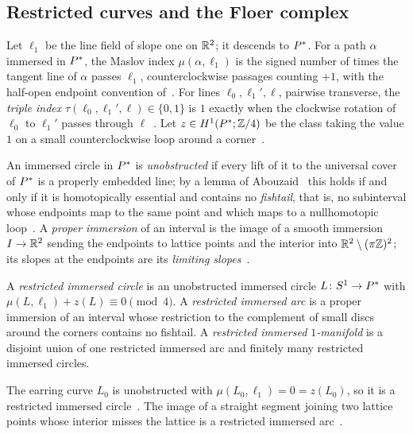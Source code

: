 \subsection{Restricted curves and the Floer complex}\label{ss:restricted}
Let $\ell_1$ be the line field of slope one on $\mathbb{R}^2$; it descends to $P^{*}$. For a path $\alpha$ immersed in $P^{*}$,
the Maslov index $\mu(\alpha,\ell_1)$ is the signed number of times the tangent line of $\alpha$ passes $\ell_1$,
counterclockwise passages counting $+1$, with the half-open endpoint convention of~\cite[\S2.3]{HHK2}. For lines
$\ell_0,\ell_1',\ell$, pairwise transverse, the \emph{triple index} $\tau(\ell_0,\ell_1',\ell)\in\{0,1\}$ is $1$
exactly when the clockwise rotation of $\ell_0$ to $\ell_1'$ passes through $\ell$~\cite[Def.~2.5]{HHK2}. Let $z\in
H^1(P^{*};\mathbb{Z}/4)$ be the class taking the value $1$ on a small counterclockwise loop around a
corner~\cite[Def.~3.1]{HHK2}.

An immersed circle in $P^{*}$ is \emph{unobstructed} if every lift of it to the universal cover of $P^{*}$ is a
properly embedded line; by a lemma of Abouzaid~\cite[Lemma~2.2]{Abouzaid} this holds if and only if it is
homotopically essential and contains no \emph{fishtail}, that is, no subinterval whose endpoints map to the same
point and which maps to a nullhomotopic loop~\cite[Def.~2.1]{HHK2}. A \emph{proper immersion} of an interval is
the image of a smooth immersion $I\to\mathbb{R}^2$ sending the endpoints to lattice points and the interior into
$\mathbb{R}^2\setminus(\pi\mathbb{Z})^2$; its slopes at the endpoints are its \emph{limiting slopes}~\cite[Def.~3.3]{HHK2}.

\begin{definition}\label{def:restricted}
A \emph{restricted immersed circle} is an unobstructed immersed circle $L\colon S^1\to P^{*}$ with
$\mu(L,\ell_1)+z(L)\equiv0\pmod4$. A \emph{restricted immersed arc} is a proper immersion of an interval whose
restriction to the complement of small discs around the corners contains no fishtail. A \emph{restricted immersed
$1$-manifold} is a disjoint union of one restricted immersed arc and finitely many restricted immersed circles.
\end{definition}

The earring curve $L_0$ is unobstructed with $\mu(L_0,\ell_1)=0=z(L_0)$, so it is a restricted immersed
circle~\cite[pp.~16,~18]{HHK2}. The image of a straight segment joining two lattice points whose interior misses the
lattice is a restricted immersed arc~\cite[p.~18]{HHK2}.

